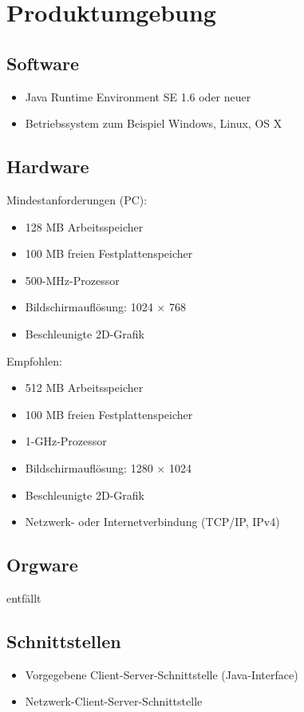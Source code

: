 \documentclass[a4paper,10pt]{article}
\begin{document}
\section{Produktumgebung}
\subsection{Software}
\begin{itemize}
\item Java Runtime Environment SE 1.6 oder neuer
\item Betriebssystem zum Beispiel Windows, Linux, OS X
\end{itemize}
\subsection{Hardware}
Mindestanforderungen (PC): 
\begin{itemize}
\item 128 MB Arbeitsspeicher
\item 100 MB freien Festplattenspeicher
\item 500-MHz-Prozessor
\item Bildschirmauflösung: 1024 $\times$ 768
\item Beschleunigte 2D-Grafik
\end{itemize}
Empfohlen:
\begin{itemize}
\item 512 MB Arbeitsspeicher
\item 100 MB freien Festplattenspeicher
\item 1-GHz-Prozessor
\item Bildschirmauflösung: 1280 $\times$ 1024
\item Beschleunigte 2D-Grafik
\item Netzwerk- oder Internetverbindung (TCP/IP, IPv4)
\end{itemize}
\subsection{Orgware}
entfällt
\subsection{Schnittstellen}
\begin{itemize}
\item Vorgegebene Client-Server-Schnittstelle (Java-Interface)
\item Netzwerk-Client-Server-Schnittstelle
\end{itemize}
\end{document}
